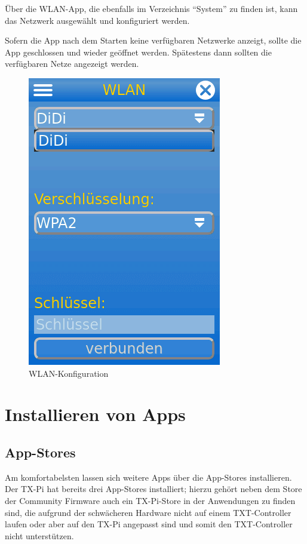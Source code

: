 \documentclass[
  paper=A4,
  ngerman,
  fontsize=12pt,
  parskip=half-,
]{scrbook}
\begin{document}
Über die WLAN-App, die ebenfalls im Verzeichnis "`System"' zu finden ist, kann das
Netzwerk ausgewählt und konfiguriert werden.

Sofern die App nach dem Starten keine verfügbaren Netzwerke anzeigt, sollte die App
geschlossen und wieder geöffnet werden. Spätestens dann sollten die verfügbaren
Netze angezeigt werden.

\begin{figure}[ht]
\centering
\includegraphics[scale=0.4]{images/wlan.png}
\caption{WLAN-Konfiguration}
\end{figure}


\chapter{Installieren von Apps}

\section{App-Stores}

Am komfortabelsten lassen sich weitere Apps über die App-Stores
installieren. Der TX-Pi hat bereits drei App-Stores installiert;
hierzu gehört neben dem Store der Community Firmware auch ein 
TX-Pi-Store in der Anwendungen zu finden sind, die aufgrund
der schwächeren Hardware nicht auf einem TXT-Controller laufen
oder aber auf den TX-Pi angepasst sind und somit den TXT-Controller
nicht unterstützen.
\end{document}
